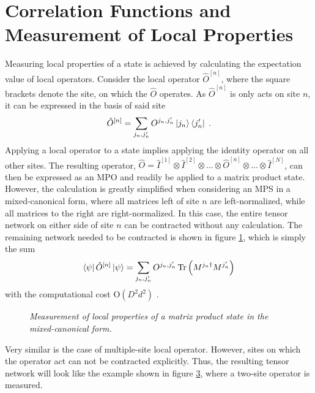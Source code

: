 \section{Correlation Functions and Measurement of Local Properties}
\label{sec:correlationFunctions}
Measuring local properties of a state is achieved by calculating the expectation value of local operators. Consider the local operator $\hat{O}^{[n]}$, where the square brackets denote the site, on which the $\hat{O}$ operates. As $\hat{O}^{[n]}$ is only acts on site $n$, it can be expressed in the basis of said site
\begin{equation}
	\hat{O}^{[n]} = \sum_{j_n , j_n '} O^{j_n , j_n '} \ket{j_n} \bra{j_n '} \; .
	\label{eq:localOperator}
\end{equation}
Applying a local operator to a state implies applying the identity operator on all other sites. The resulting operator, $\hat{O} = \hat{I}^{[1]} \otimes \hat{I}^{[2]} \otimes \ldots \otimes \hat{O}^{[n]} \otimes \ldots \otimes \hat{I}^{[N]}$, can then be expressed as an MPO and readily be applied to a matrix product state. However, the calculation is greatly simplified when considering an MPS in a mixed-canonical form, where all matrices left of site $n$ are left-normalized, while all matrices to the right are right-normalized. In this case, the entire tensor network on either side of site $n$ can be contracted without any calculation. The remaining network needed to be contracted is shown in figure \ref{fig:SingleSiteOperator}, which is simply the sum
\begin{equation}
	\bra{\psi} \hat{O}^{[n]} \ket{\psi} = \sum_{j_n , j_n '} O^{j_n , j_n '} \Tr \left( M^{j_n \dag} M^{j_n '} \right) 
\end{equation}
with the computational cost $\mathrm{O}(D^2 d^2)$ \cite{schollwock}.
\begin{figure}[h!]
\centering %
\begin{subfigure}[b]{0.35\textwidth}
  	
	\caption{}
	\label{fig:SingleSiteOperator}
\end{subfigure}
\begin{subfigure}[b]{0.35\textwidth}    
  	
	\caption{}
	\label{fig:DoubleSiteOperator}
\end{subfigure}
\caption{\textit{Measurement of local properties of a matrix product state in the mixed-canonical form.}}
\end{figure}
Very similar is the case of multiple-site local operator. However, sites on which the operator act can not be contracted explicitly. Thus, the resulting tensor network will look like the example shown in figure \ref{fig:DoubleSiteOperator}, where a two-site operator is measured.\\

